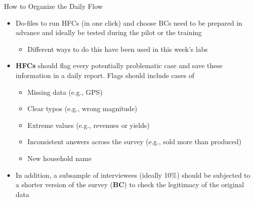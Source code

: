 \documentclass[aspectratio=169]{beamer}
\begin{document}
\begin{frame}{How to Organize the Daily Flow}

    \begin{itemize}
        \setlength\itemsep{1.1em}
        
        \item Do-files to run HFCs (in one click) and choose BCs need to be prepared in advance and ideally be tested during the pilot or the training
        \begin{itemize}
            \item Different ways to do this have been used in this week's labs 
        \end{itemize}
        
        \item \textbf{HFCs} should flag every potentially problematic case and save these information in a daily report. Flags should include cases of 
        \begin{itemize}
            \item Missing data (e.g., GPS)
            \item Clear typos (e.g., wrong magnitude)
            \item Extreme values (e.g., revenues or yields)
            \item Inconsistent answers across the survey (e.g., sold more than produced)
            \item New household name
        \end{itemize}
    
        \pause
        \item In addition, a subsample of interviewees (ideally 10\%) should be subjected to a shorter version of the survey (\textbf{BC}) to check the legitimacy of the original data
        
    \end{itemize}
\end{frame}
\end{document}
